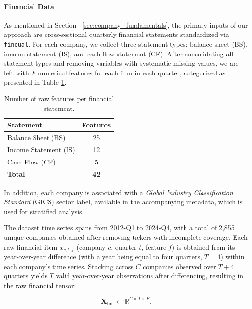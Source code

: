 \documentclass[a4paper,fleqn]{cas-dc}
\begin{document}
\paragraph{Financial Data}
As mentioned in Section ~\ref{sec:company_fundamentals},  the primary inputs of our approach are cross-sectional quarterly financial statements standardized
via \texttt{finqual}.
For each company, we collect three statement types: balance sheet (BS), income statement (IS), and cash-flow statement (CF).  After consolidating all statement types and removing variables with systematic missing values, we are left with $F$ numerical features for each firm in each quarter, categorized as presented in Table \ref{tab:features}. 
\begin{table}[H]
\centering
\caption{Number of raw features per financial statement.}
\label{tab:features}
\begin{tabular}{lc}
\toprule
\textbf{Statement} & \textbf{Features} \\
\midrule
Balance Sheet (BS)    & 25 \\
Income Statement (IS) & 12 \\
Cash Flow (CF)        &  5 \\
\midrule
\textbf{Total}        & \textbf{42} \\
\bottomrule
\end{tabular}
\end{table}
In addition, each company is associated with a \textit{Global Industry Classification Standard} (GICS) sector label, available in the accompanying metadata, which is used for stratified analysis.

The dataset time series spans from 2012-Q1 to 2024-Q4, with a total of 2,855 unique companies obtained after removing tickers with
incomplete coverage.  Each raw financial item $x_{c,t,f}$ (company $c$, quarter $t$, feature $f$) is obtained from its year-over-year difference (with a year being equal to four quarters, $T=4$) within each company's time series. Stacking across $C$ companies observed over $T+4$ quarters yields $T$ valid year-over-year observations after differencing, resulting in the raw financial tensor:

\begin{equation}
  \mathbf{X}_{\mathrm{fin}} \;\in\; \mathbb{R}^{C \times T \times F}.
\end{equation}
\end{document}
